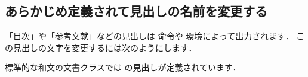 

\subsection{あらかじめ定義されて見出しの名前を変更する}
%
「目次」や「参考文献」などの見出しは 命令や
環境によって出力されます．
この見出しの文字を変更するには次のようにします．
\begin{intext}
\renewcommand{\refname}{関連書籍}
\end{intext}

標準的な和文の文書クラスでは
の見出しが定義されています．

